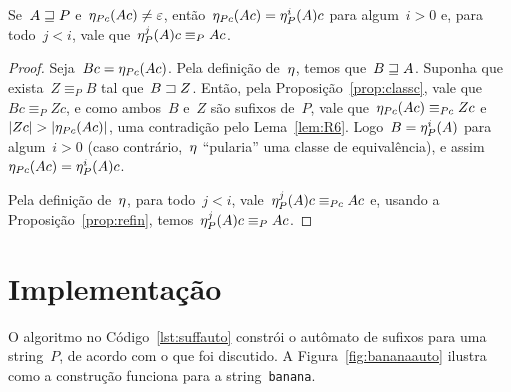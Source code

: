 \begin{lemma} \label{lem:failpc}
Se~$A \sqsupseteq P$ e~$\eta_{Pc}(Ac) \neq \varepsilon$, então~${\eta_{Pc}(Ac) = \eta_P^i(A)c}$ para algum~${i > 0}$ e, para todo~$j < i$, vale que~$\eta_P^j(A)c \equiv_P Ac$.
\end{lemma}

\begin{proof}
Seja~${Bc = \eta_{Pc}(Ac)}$. Pela definição de~$\eta$, temos que~${B \sqsupseteq A}$. Suponha que exista~${Z \equiv_P B}$ tal que~$B \sqsupset Z$. Então, pela Proposição~\ref{prop:classc}, vale que~${Bc \equiv_P Zc}$, e como ambos~$B$ e~$Z$ são sufixos de~$P$, vale que~${\eta_{Pc}(Ac) \equiv_{Pc} Zc}$ e~${|Zc| > |\eta_{Pc}(Ac)|}$, uma contradição pelo Lema~\ref{lem:R6}.
Logo~$B = \eta_P^i(A)$ para algum~$i > 0$ (caso contrário,~$\eta$ ``pularia'' uma classe de equivalência), e assim~$\eta_{Pc}(Ac) = \eta_P^i(A)c$.

Pela definição de~$\eta$, para todo~$j < i$, vale~${\eta_P^j(A)c \equiv_{Pc} Ac}$ e, usando a Proposição~\ref{prop:refin}, temos~${\eta_P^j(A)c \equiv_P Ac}$.
\end{proof}

\section{Implementação}

O algoritmo no Código~\ref{lst:suffauto} constrói o autômato de sufixos para uma string~$P$, de acordo com o que foi discutido. A Figura~\ref{fig:bananaauto} ilustra como a construção funciona para a string~\texttt{banana}.

